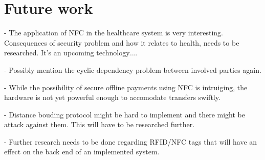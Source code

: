 \section{Future work}
\label{chap:future_work}

- The application of NFC in the healthcare system is very interesting. Consequences of security problem and how it relates to health, needs to be researched. It's an upcoming technology....

- Possibly mention the cyclic dependency problem between involved parties again.

- While the possibility of secure offline payments using NFC is intruiging, the hardware is not yet powerful enough to accomodate transfers swiftly.

- Distance bouding protocol might be hard to implement and there might be attack against them. This will have to be researched further.

- Further research needs to be done regarding RFID/NFC tags that will have an effect on the back end of an implemented system. 
